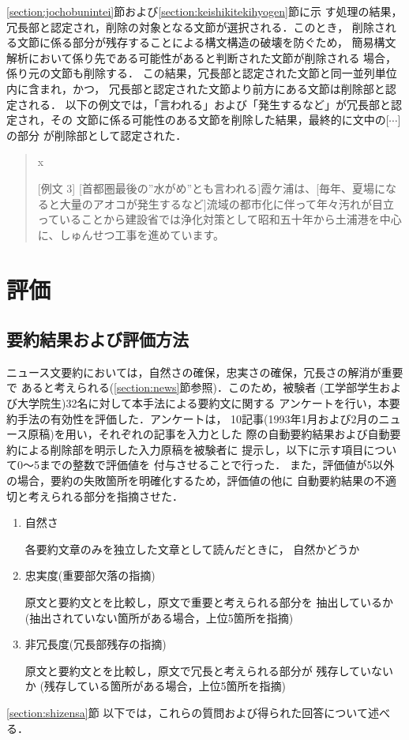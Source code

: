 \ref{section:jochobunintei}節および\ref{section:keishikitekihyogen}節に示
す処理の結果，冗長部と認定され，削除の対象となる文節が選択される．このとき，
削除される文節に係る部分が残存することによる構文構造の破壊を防ぐため，
簡易構文解析において係り先である可能性があると判断された文節が削除される
場合，係り元の文節も削除する．
この結果，冗長部と認定された文節と同一並列単位内に含まれ，かつ，
冗長部と認定された文節より前方にある文節は削除部と認定される．
以下の例文では，「言われる」および「発生するなど」が冗長部と認定され，その
文節に係る可能性のある文節を削除した結果，最終的に文中の[$\cdots$]の部分
が削除部として認定された．
\begin{quote}
 \begin{namelist}{x}
  
  \item[{[例文 3]}]
\label{part:008}
[首都圏最後の”水がめ”とも言われる]霞ケ浦は、[毎年、夏場になると大量のアオコが発生するなど]流域の都市化に伴って年々汚れが目立っていることから建設省では浄化対策として昭和五十年から土浦港を中心に、しゅんせつ工事を進めています。
 \end{namelist}
\end{quote}

\section{評価}
\label{section:evaluation}

\subsection{要約結果および評価方法}

ニュース文要約においては，自然さの確保，忠実さの確保，冗長さの解消が重要で
あると考えられる(\ref{section:news}節参照)．このため，被験者
(工学部学生および大学院生)32名に対して本手法による要約文に関する
アンケートを行い，本要約手法の有効性を評価した．アンケートは，
10記事(1993年1月および2月のニュース原稿)を用い，それぞれの記事を入力とした
際の自動要約結果および自動要約による削除部を明示した入力原稿を被験者に
提示し，以下に示す項目について0〜5までの整数で評価値を
付与させることで行った．
また，評価値が5以外の場合，要約の失敗箇所を明確化するため，評価値の他に
自動要約結果の不適切と考えられる部分を指摘させた．
\begin{enumerate}
 \item 自然さ

       各要約文章のみを独立した文章として読んだときに，
       自然かどうか

 \item 忠実度(重要部欠落の指摘)

       原文と要約文とを比較し，原文で重要と考えられる部分を
       抽出しているか
       (抽出されていない箇所がある場合，上位5箇所を指摘)

 \item 非冗長度(冗長部残存の指摘)

       原文と要約文とを比較し，原文で冗長と考えられる部分が
       残存していないか
       (残存している箇所がある場合，上位5箇所を指摘)

\end{enumerate}
\ref{section:shizensa}節
以下では，これらの質問および得られた回答について述べる．

